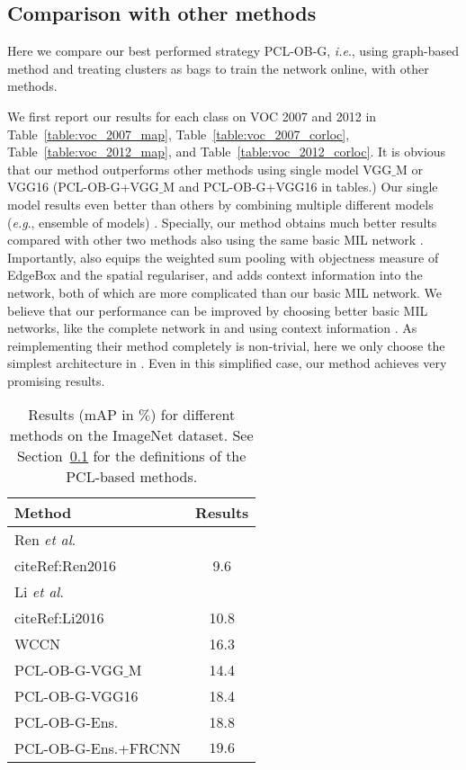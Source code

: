 \documentclass[10pt,journal,compsoc]{IEEEtran}
\def\methodname{PCL}
\def\eg{\emph{e.g}.} \def\Eg{\emph{E.g}.}
\def\ie{\emph{i.e}.} \def\Ie{\emph{I.e}.}
\def\etal{\emph{et al}.}
\begin{document}
\subsection{Comparison with other methods}
\label{sec:compar}

Here we compare our best performed strategy \methodname-OB-G,
\ie, using graph-based method and treating clusters as bags to train the network online,
with other methods.

We first report our results for each class on VOC 2007 and 2012 in Table~\ref{table:voc_2007_map}, Table~\ref{table:voc_2007_corloc}, Table~\ref{table:voc_2012_map}, and Table~\ref{table:voc_2012_corloc}.
It is obvious that our method outperforms other methods \cite{Ref:Bilen2016,Ref:Kantorov2016} using single model VGG$\_$M or VGG16 (\methodname-OB-G+VGG$\_$M and \methodname-OB-G+VGG16 in tables.)
Our single model results even better than others by combining multiple different models (\eg, ensemble of models) \cite{Ref:Bilen2016,Ref:Li2016,Ref:Jie2017,Ref:Diba2017}.
Specially, our method obtains much better results compared with other two methods also using the same basic MIL network \cite{Ref:Bilen2016,Ref:Kantorov2016}.
Importantly, \cite{Ref:Bilen2016} also equips the weighted sum pooling with objectness measure of EdgeBox \cite{Ref:Zitnick2014} and the spatial regulariser, and \cite{Ref:Kantorov2016} adds context information into the network, both of which are more complicated than our basic MIL network.
We believe that our performance can be improved by choosing better basic MIL networks, like the complete network in \cite{Ref:Bilen2016} and using context information \cite{Ref:Kantorov2016}.
As reimplementing their method completely is non-trivial, here we only choose the simplest architecture in \cite{Ref:Bilen2016}.
Even in this simplified case, our method achieves very promising results.


\begin{table}[t]
\caption{Results (mAP in $\%$) for different methods on the ImageNet dataset.
See Section~\ref{sec:compar} for the definitions of the \methodname-based methods.}
\begin{center}
\footnotesize
\begin{tabular}{|l|c|}
  \hline
  Method & Results \\
  \hline
  \hline
  Ren \etal\\cite{Ref:Ren2016} & 9.6 \\
  Li \etal\\cite{Ref:Li2016} & 10.8 \\
  WCCN \cite{Ref:Diba2017} & 16.3 \\
  \hline
  \methodname-OB-G-VGG$\_$M & 14.4 \\
  \methodname-OB-G-VGG16 & 18.4 \\
  \methodname-OB-G-Ens. & 18.8 \\
  \methodname-OB-G-Ens.+FRCNN & $\bm{19.6}$ \\
  \hline
\end{tabular}
\end{center}
\label{table:imagenet}
\end{table}
\end{document}
